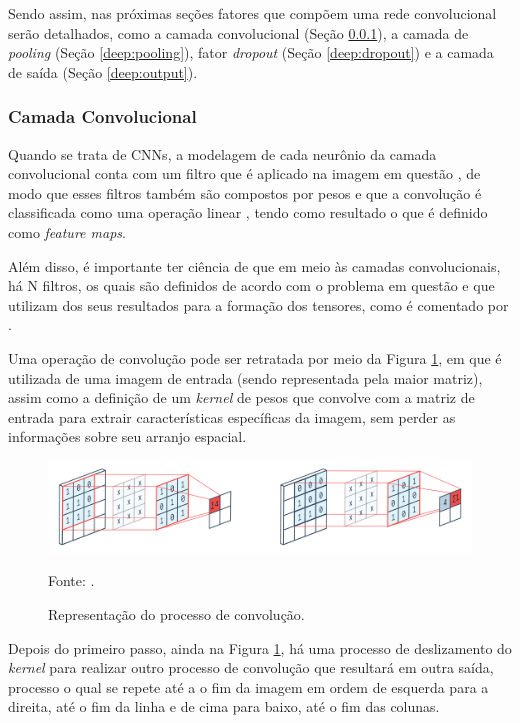 Sendo assim, nas próximas seções fatores que compõem uma rede convolucional serão detalhados, como a camada convolucional (Seção \ref{deep:conv}), a camada de \textit{pooling} (Seção \ref{deep:pooling}), fator \textit{dropout} (Seção \ref{deep:dropout}) e a camada de saída (Seção \ref{deep:output}).


\subsubsection{Camada Convolucional}
\label{deep:conv}

Quando se trata de CNNs, a modelagem de cada neurônio da camada convolucional conta com um filtro que é aplicado na imagem em questão \cite{ponti2018funciona}, de modo que esses filtros também são compostos por pesos e que a convolução é classificada como uma operação linear \cite{Goodfellow2016}, tendo como resultado o que é definido como \textit{feature maps}.

Além disso, é importante ter ciência de que em meio às camadas convolucionais, há N filtros, os quais são definidos de acordo com o problema em questão e que utilizam dos seus resultados para a formação dos tensores, como é comentado por \cite{ponti2018funciona}.

Uma operação de convolução pode ser retratada por meio da Figura \ref{deep:fig:6}, em que é  utilizada de uma imagem de entrada (sendo representada pela maior matriz), assim como a definição de um \textit{kernel} de pesos que convolve com a matriz de entrada para extrair características específicas da imagem, sem perder as informações sobre seu arranjo espacial.

\begin{figure}[H]
    \centering
    \caption{Representação do processo de convolução.}
    \includegraphics[width=1\linewidth]{recursos/imagens/deep/2d_convolution.png}
    \label{deep:fig:6}
    
    \vspace*{1 cm}
    Fonte: \cite{PeltarionAI}.
\end{figure}

Depois do primeiro passo, ainda na Figura \ref{deep:fig:6}, há uma processo de deslizamento do \textit{kernel} para realizar outro processo de convolução que resultará em outra saída, processo o qual se repete até a o fim da imagem em ordem de esquerda para a direita, até o fim da linha e de cima para baixo, até o fim das colunas.


